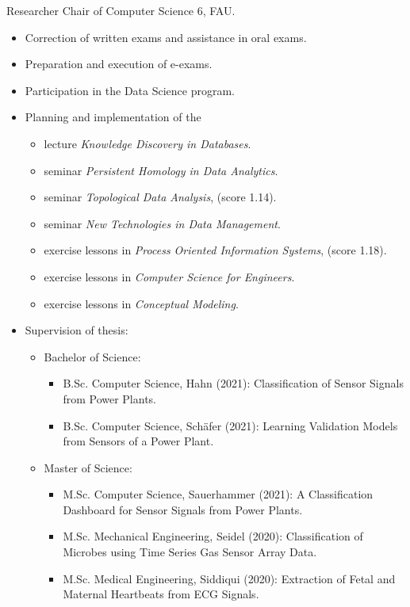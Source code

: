 \documentclass[a4paper, 11pt]{article}
\newcommand{\years}[1]{\marginnote{\scriptsize #1}}
\begin{document}
	\years{2018--21} Researcher Chair of Computer Science 6, FAU.
	\begin{itemize}
		\item Correction of written exams and assistance in oral exams.

		\item Preparation and execution of e-exams.

		\item Participation in the Data Science program.

		\item Planning and implementation of the
			\begin{itemize}
				\item lecture \emph{Knowledge Discovery in Databases}.

				\item seminar \emph{Persistent Homology in Data Analytics}.

				\item seminar \emph{Topological Data Analysis}, (score 1.14).

				\item seminar \emph{New Technologies in Data Management}.

				\item exercise lessons in \emph{Process Oriented Information Systems}, (score 1.18).

				\item exercise lessons in \emph{Computer Science for Engineers}.

				\item exercise lessons in \emph{Conceptual Modeling}.
			\end{itemize}

		\item Supervision of thesis:
			\begin{itemize}[noitemsep, leftmargin=*]
				\item Bachelor of Science:
					\begin{itemize}
						\item B.Sc. Computer Science, Hahn (2021): Classification of Sensor
							Signals from Power Plants.

						\item B.Sc. Computer Science, Schäfer (2021): Learning Validation
							Models from Sensors of a Power Plant.
					\end{itemize}

				\item Master of Science:
					\begin{itemize}
						\item M.Sc. Computer Science, Sauerhammer (2021): A Classification
							Dashboard for Sensor Signals from Power Plants.

						\item M.Sc. Mechanical Engineering, Seidel (2020): Classification of
							Microbes using Time Series Gas Sensor Array Data.

						\item M.Sc. Medical Engineering, Siddiqui (2020): Extraction of
							Fetal and Maternal Heartbeats from ECG Signals.
					\end{itemize}
			\end{itemize}
	\end{itemize}
\end{document}
